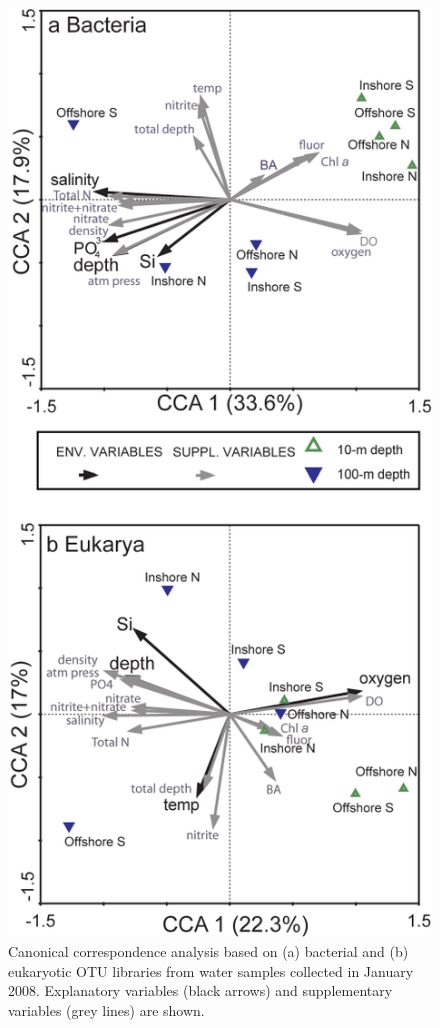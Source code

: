 \begin{figure}
	[htbp] \centering 
	\includegraphics{Chapter_2_MIRADA/Figures/Figure_3_CCA} 
	\caption[Canonical correspondence analysis based on summer bacterial and eukaryotic OTU libraries.]{Canonical correspondence analysis based on (a) bacterial and (b) eukaryotic OTU libraries from water samples collected in January 2008. Explanatory variables (black arrows) and supplementary variables (grey lines) are shown.} 
	\label{fig:cca1.2} 
\end{figure}

